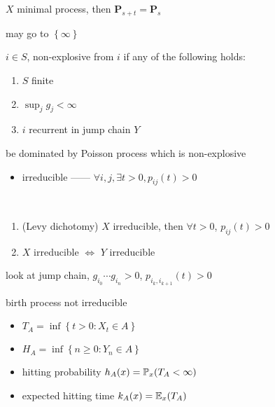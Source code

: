 \begin{prop}
    $X$ minimal process, then $\textbf{P}_{s+t} = \textbf{P}_s$
\end{prop}
\begin{pf}
    may go to $\left\{ \infty \right\}$
\end{pf}

\begin{thm}
    $i \in S$, non-explosive from $i$ if any of the following holds:
    \begin{enumerate}
        \item $S$ finite
        \item $\sup_j g_j < \infty$
        \item $i$ recurrent in jump chain $Y$
    \end{enumerate}
\end{thm}
\begin{pf}
    be dominated by Poisson process which is non-explosive
\end{pf}

\begin{itemize}
    \item irreducible ------ $\forall i,j, \exists t > 0, p_{ij}(t) > 0$
\end{itemize}

\begin{thm}\,
    \begin{enumerate}
        \item (Levy dichotomy) $X$ irreducible, then $\forall t > 0$, $p_{ij}(t) > 0$
        \item $X$ irreducible $\iff$ $Y$ irreducible
    \end{enumerate}
\end{thm}
\begin{pf}
    look at jump chain, $g_{i_0}\cdots g_{i_n} > 0$, $p_{i_k, i_{k+1}}(t) > 0$
\end{pf}

\begin{fact}
    birth process not irreducible
\end{fact}

\begin{itemize}
    \item $T_A = \inf \left\{ t > 0 : X_t \in A \right\}$
    \item $H_A = \inf \left\{ n \geq 0 : Y_n \in A \right\}$
    \item hitting probability $h_A(x) = \mathbb{P}_x(T_A < \infty)$
    \item expected hitting time $k_A(x) = \mathbb{E}_x(T_A)$
\end{itemize}


